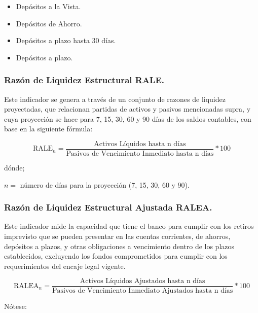 \documentclass[]{article}
\providecommand{\tightlist}{%
  \setlength{\itemsep}{0pt}\setlength{\parskip}{0pt}}
\begin{document}
\begin{itemize}
\tightlist
\item
  Depósitos a la Vista.\\
\item
  Depósitos de Ahorro.\\
\item
  Depósitos a plazo hasta 30 días.
\item
  Depósitos a plazo.
\end{itemize}

\hypertarget{razon-de-liquidez-estructural-rale.}{%
\subsubsection{\texorpdfstring{\textbf{Razón de Liquidez Estructural}
RALE.}{Razón de Liquidez Estructural RALE.}}\label{razon-de-liquidez-estructural-rale.}}

Este indicador se genera a través de un conjunto de razones de liquidez
proyectadas, que relacionan partidas de activos y pasivos mencionadas
supra, y cuya proyección se hace para 7, 15, 30, 60 y 90 días de los
saldos contables, con base en la siguiente fórmula:

\[\text{RALE}_n = \frac{\text{Activos Líquidos hasta n días}}{\text{Pasivos de Vencimiento Inmediato hasta n días}}*100\]

dónde;

\(n=\) número de días para la proyección (7, 15, 30, 60 y 90).

\hypertarget{razon-de-liquidez-estructural-ajustada-ralea.}{%
\subsubsection{\texorpdfstring{\textbf{Razón de Liquidez Estructural
Ajustada}
RALEA.}{Razón de Liquidez Estructural Ajustada RALEA.}}\label{razon-de-liquidez-estructural-ajustada-ralea.}}

Este indicador mide la capacidad que tiene el banco para cumplir con los
retiros imprevisto que se pueden presentar en las cuentas corrientes, de
ahorros, depósitos a plazos, y otras obligaciones a vencimiento dentro
de los plazos establecidos, excluyendo los fondos comprometidos para
cumplir con los requerimientos del encaje legal vigente.

\[\text{RALEA}_n = \frac{\text{Activos Líquidos Ajustados hasta n días}}{\text{Pasivos de Vencimiento Inmediato Ajustados hasta n días}}*100\]

Nótese:
\end{document}
